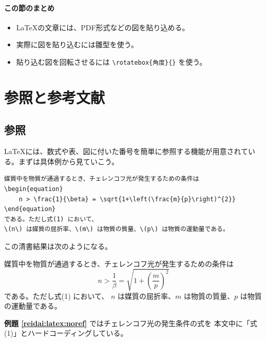 \paragraph{この節のまとめ}

\begin{itemize}
    \item \LaTeX の文章には、PDF形式などの図を貼り込める。
    \item 実際に図を貼り込むには雛型を使う。
    \item 貼り込む図を回転させるには \verb|\rotatebox{角度}{}| を使う。
\end{itemize}

\section{参照と参考文献}
\label{sec:latex:ref_and_bib}

\subsection{参照}
\label{sec:latex:reference}

\LaTeX には、数式や表、図に付いた番号を簡単に参照する機能が用意されている。まずは具体例から見ていこう。
\begin{reidai}
    \label{reidai:latex:noref}
    \begin{verbatim}
媒質中を物質が通過するとき、チェレンコフ光が発生するための条件は
\begin{equation}
    n > \frac{1}{\beta} = \sqrt{1+\left(\frac{m}{p}\right)^{2}}
\end{equation}
である。ただし式(1) において、
\(n\) は媒質の屈折率、\(m\) は物質の質量、\(p\) は物質の運動量である。
\end{verbatim}
\end{reidai} \noindent
この清書結果は次のようになる。
\begin{kekka}
    媒質中を物質が通過するとき、チェレンコフ光が発生するための条件は
    \begin{equation}
        n > \frac{1}{\beta} = \sqrt{1+\left(\frac{m}{p}\right)^{2}}
    \end{equation}
    である。ただし式(1) において、
    \(n\) は媒質の屈折率、\(m\) は物質の質量、\(p\) は物質の運動量である。\\
\end{kekka} \noindent
\textbf{例題 \ref{reidai:latex:noref}} ではチェレンコフ光の発生条件の式を
本文中に「式(1)」とハードコーディングしている。

